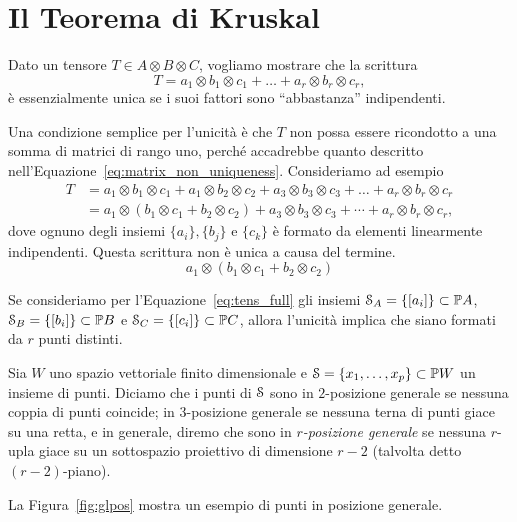 \section{Il Teorema di Kruskal}

Dato un tensore $ T \in A \otimes B \otimes C $, vogliamo mostrare che la scrittura
\begin{equation}
	\label{eq:tens_full}
	T = a_1 \otimes b_1 \otimes c_1 + \ldots + a_r \otimes b_r \otimes c_r
	,\end{equation}
è essenzialmente unica se i suoi fattori sono ``abbastanza'' indipendenti.

\begin{remark}
	Una condizione semplice per l'unicità è che $ T $
	non possa essere ricondotto a una somma di matrici di rango uno, perché accadrebbe quanto
	descritto nell'Equazione~\eqref{eq:matrix_non_uniqueness}. Consideriamo ad esempio
	\begin{equation*}
		\begin{aligned}
			T & = a_1 \otimes b_1\otimes c_1  + a_1 \otimes b_2 \otimes c_2 + a_3 \otimes b_3 \otimes c_3 +
			\ldots + a_r \otimes b_r \otimes c_r                                                            \\
			  & = a_1 \otimes (b_1\otimes c_1 + b_2 \otimes c_2) + a_3 \otimes b_3 \otimes c_3 + \cdots +
			a_{r} \otimes b_{r} \otimes c_{r},
		\end{aligned}
	\end{equation*}
	dove ognuno degli insiemi $ \{a_i\}, \{b_j\}   $ e $ \{c_k\}  $ è formato da elementi
	linearmente indipendenti. Questa scrittura non è unica a causa del termine.
	\begin{equation*}
		a_1 \otimes (b_1\otimes c_1 + b_2 \otimes c_2)
	\end{equation*}
\end{remark}

\begin{remark}
	Se consideriamo per l'Equazione~\eqref{eq:tens_full} gli insiemi $ \mathcal{S}_A = \{[a_i]\} \subset
		\mathbb{P} A$, $
		\mathcal{S}_B = \{[b_i]\} \subset \mathbb{P} B  $ e $ \mathcal{S}_C = \{[c_i]\} \subset \mathbb{P} C$, allora l'unicità implica che
	siano formati da $ r $ punti distinti.
\end{remark}

\begin{definition}
	Sia $ W $ uno spazio vettoriale finito dimensionale e $ \mathcal{S} = \{x_1, \ldots, x_p\} \subset \mathbb{P} W  $ un insieme di punti.
	Diciamo che i punti di $ \mathcal{S}  $ sono in $ 2 $-posizione generale se nessuna coppia di punti
	coincide; in $ 3 $-posizione generale se nessuna terna di punti giace su una retta, e in
	generale, diremo che sono in \emph{$ r $-posizione generale} se nessuna $ r $-upla giace su un
	sottospazio proiettivo di dimensione $ r-2 $ (talvolta detto $ (r-2) $-piano).
\end{definition}
La Figura~\ref{fig:glpos} mostra un esempio di punti in posizione generale.

